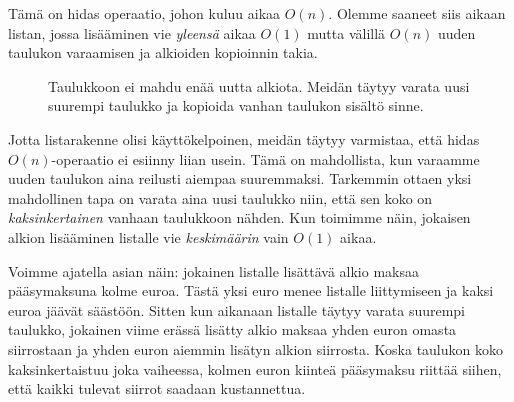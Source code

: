 Tämä on hidas operaatio, johon kuluu aikaa $O(n)$.
Olemme saaneet siis aikaan listan, jossa lisääminen vie
\emph{yleensä} aikaa $O(1)$ mutta välillä $O(n)$
uuden taulukon varaamisen ja alkioiden kopioinnin takia.

\begin{figure}
\center
{}
\caption{Taulukkoon ei mahdu enää uutta alkiota. Meidän täytyy varata uusi suurempi taulukko
ja kopioida vanhan taulukon sisältö sinne.}
\label{fig:lisuus}
\end{figure}

Jotta listarakenne olisi käyttökelpoinen, meidän täytyy varmistaa,
että hidas $O(n)$-operaatio ei esiinny liian usein.
Tämä on mahdollista, kun varaamme uuden taulukon aina reilusti aiempaa suuremmaksi.
Tarkemmin ottaen yksi mahdollinen tapa on varata aina uusi taulukko niin,
että sen koko on \emph{kaksinkertainen} vanhaan taulukkoon nähden.
Kun toimimme näin, jokaisen alkion lisääminen listalle vie
\emph{keskimäärin} vain $O(1)$ aikaa.

Voimme ajatella asian näin: jokainen listalle lisättävä alkio
maksaa pääsy\-maksuna kolme euroa.
Tästä yksi euro menee listalle liittymiseen ja kaksi euroa jäävät säästöön.
Sitten kun aikanaan listalle täytyy varata suurempi taulukko,
jokainen viime erässä lisätty alkio maksaa yhden euron omasta siirrostaan
ja yhden euron aiemmin lisätyn alkion siirrosta.
Koska taulukon koko kaksinkertaistuu joka vaiheessa,
kolmen euron kiinteä pääsymaksu riittää siihen, että kaikki tulevat
siirrot saadaan kustannettua.


